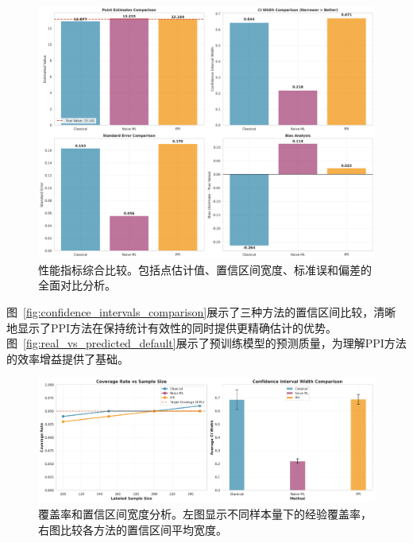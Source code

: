 \documentclass[12pt,a4paper]{article}
\begin{document}
\begin{figure}[H]
    \centering
    \includegraphics[width=1.0\textwidth]{performance_metrics_summary.png}
    \caption{性能指标综合比较。包括点估计值、置信区间宽度、标准误和偏差的全面对比分析。}
    \label{fig:performance_metrics_summary}
\end{figure}

图~\ref{fig:confidence_intervals_comparison}展示了三种方法的置信区间比较，清晰地显示了PPI方法在保持统计有效性的同时提供更精确估计的优势。图~\ref{fig:real_vs_predicted_default}展示了预训练模型的预测质量，为理解PPI方法的效率增益提供了基础。

\begin{figure}[H]
    \centering
    \includegraphics[width=1.0\textwidth]{coverage_rate_analysis.png}
    \caption{覆盖率和置信区间宽度分析。左图显示不同样本量下的经验覆盖率，右图比较各方法的置信区间平均宽度。}
    \label{fig:coverage_rate_analysis}
\end{figure}
\end{document}
